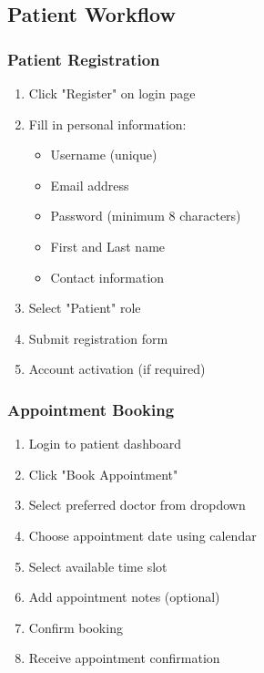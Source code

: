 \documentclass[12pt,a4paper]{article}
\begin{document}
\subsection{Patient Workflow}

\subsubsection{Patient Registration}

\begin{enumerate}
    \item Click "Register" on login page
    \item Fill in personal information:
    \begin{itemize}
        \item Username (unique)
        \item Email address
        \item Password (minimum 8 characters)
        \item First and Last name
        \item Contact information
    \end{itemize}
    \item Select "Patient" role
    \item Submit registration form
    \item Account activation (if required)
\end{enumerate}

\subsubsection{Appointment Booking}

\begin{enumerate}
    \item Login to patient dashboard
    \item Click "Book Appointment"
    \item Select preferred doctor from dropdown
    \item Choose appointment date using calendar
    \item Select available time slot
    \item Add appointment notes (optional)
    \item Confirm booking
    \item Receive appointment confirmation
\end{enumerate}
\end{document}
